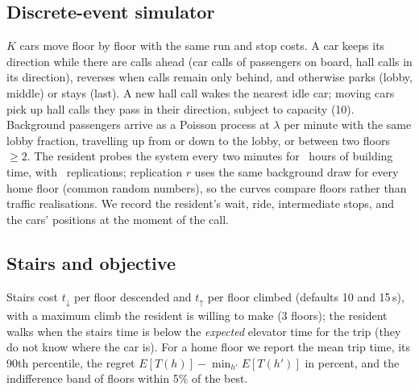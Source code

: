\subsection{Discrete-event simulator}
$K$ cars move floor by floor with the same run and stop costs. A car keeps its
direction while there are calls ahead (car calls of passengers on board, hall
calls in its direction), reverses when calls remain only behind, and otherwise
parks (lobby, middle) or stays (last). A new hall call wakes the nearest idle
car; moving cars pick up hall calls they pass in their direction, subject to
capacity (10). Background passengers arrive as a Poisson process at
$\lambda$ per minute with the same lobby fraction, travelling up from or down
to the lobby, or between two floors $\ge 2$. The resident probes the system
every two minutes for \TraHorizon\ hours of building time, with \TraReps\
replications; replication $r$ uses the same background draw for every home
floor (common random numbers), so the curves compare floors rather than
traffic realisations. We record the resident's wait, ride, intermediate stops,
and the cars' positions at the moment of the call.

\subsection{Stairs and objective}
Stairs cost $t_{\downarrow}$ per floor descended and $t_{\uparrow}$ per floor
climbed (defaults 10 and 15\,s), with a maximum climb the resident is willing
to make (3 floors); the resident walks when the stairs time is below the
\emph{expected} elevator time for the trip (they do not know where the car
is). For a home floor we report the mean trip time, its 90th percentile, the
regret $E[T(h)] - \min_{h'} E[T(h')]$ in percent, and the indifference band of
floors within 5\% of the best.
